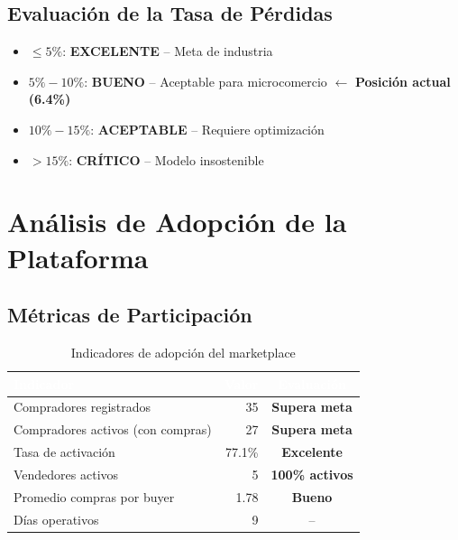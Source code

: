 \documentclass[12pt, a4paper]{article}
\begin{document}
\subsection{Evaluación de la Tasa de Pérdidas}

\begin{center}
\end{center}

\begin{itemize}
    \item $\leq 5\%$: \textcolor{successgreen}{\textbf{EXCELENTE}} -- Meta de industria
    \item $5\% - 10\%$: \textcolor{accentgreen}{\textbf{BUENO}} -- Aceptable para microcomercio $\leftarrow$ \textbf{Posición actual (6.4\%)}
    \item $10\% - 15\%$: \textcolor{warnorange}{\textbf{ACEPTABLE}} -- Requiere optimización
    \item $> 15\%$: \textcolor{dangered}{\textbf{CRÍTICO}} -- Modelo insostenible
\end{itemize}

\section{Análisis de Adopción de la Plataforma}

\subsection{Métricas de Participación}

\begin{table}[H]
\centering
\caption{Indicadores de adopción del marketplace}
\begin{tabular}{l r c}
\toprule
\rowcolor{tableheader}
\textcolor{white}{\textbf{Indicador}} & \textcolor{white}{\textbf{Valor}} & \textcolor{white}{\textbf{Evaluación}} \\
\midrule
Compradores registrados & 35 & \textcolor{successgreen}{\textbf{Supera meta}} \\
\rowcolor{rowalt}
Compradores activos (con compras) & 27 & \textcolor{successgreen}{\textbf{Supera meta}} \\
Tasa de activación & 77.1\% & \textcolor{successgreen}{\textbf{Excelente}} \\
\rowcolor{rowalt}
Vendedores activos & 5 & \textcolor{successgreen}{\textbf{100\% activos}} \\
Promedio compras por buyer & 1.78 & \textcolor{accentgreen}{\textbf{Bueno}} \\
\rowcolor{rowalt}
Días operativos & 9 & -- \\
\bottomrule
\end{tabular}
\end{table}
\end{document}
